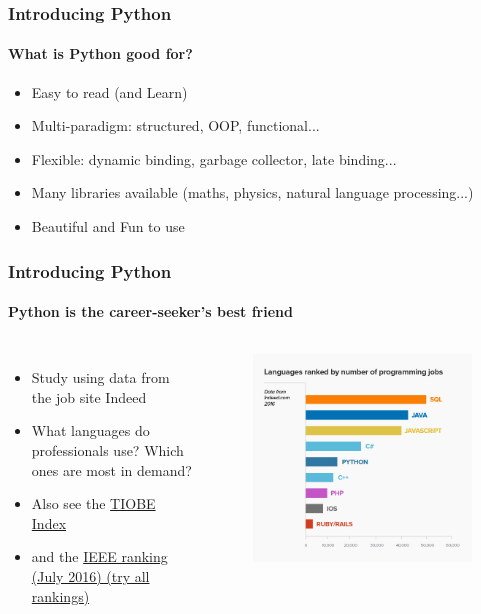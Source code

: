 \documentclass{beamer}
\begin{document}
	\begin{frame}
	\frametitle{Introducing Python}
	\framesubtitle{What is Python good for?}
	\begin{itemize}
		\item Easy to read (and Learn)
		\item Multi-paradigm: structured, OOP, functional...
		\item Flexible: dynamic binding, garbage collector, late binding...
		\item Many libraries available (maths, physics, natural language processing...)
		\item Beautiful and Fun to use 
	\end{itemize}
	\end{frame}

	\begin{frame}
	\frametitle{Introducing Python}
	\framesubtitle{Python is the career-seeker's best friend}
	\begin{columns}
		\begin{itemize}
			\item Study using data from the job site Indeed
			\item What languages do professionals use? Which ones are most in demand?
			\item Also see the \href{http://www.tiobe.com/tiobe-index/}{TIOBE Index}
			\item and the \href{http://spectrum.ieee.org/static/interactive-the-top-programming-languages-2016}{IEEE ranking (July 2016) (try all rankings)}
		\end{itemize}
	        \begin{figure}[h]
                \centering
                \includegraphics[width=\textwidth]{./images/Programming-Languages-for-2016_graph}

\end{figure}
\end{columns}
\end{frame}
\end{document}

